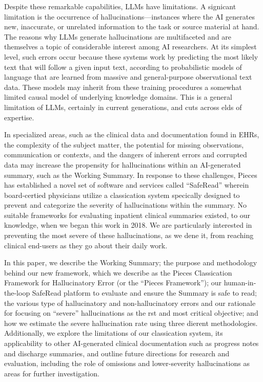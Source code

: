 \documentclass{style/myclass}
\begin{document}
Despite these remarkable capabilities, LLMs have limitations. A signicant limitation is the occurrence of hallucinations—instances where the AI generates new, inaccurate, or unrelated information to the task or source material at hand. The reasons why LLMs generate hallucinations are multifaceted and are themselves a topic of considerable interest among AI researchers. At its simplest level, such errors occur because these systems work by predicting the most likely text that will follow a given input text, according to probabilistic models of language that are learned from massive and general-purpose observational text data. These models may inherit from these training procedures a somewhat limited causal model of underlying knowledge domains. This is a general limitation of LLMs, certainly in current generations, and cuts across elds of expertise.

In specialized areas, such as the clinical data and documentation found in EHRs, the complexity of the subject matter, the potential for missing observations, communication or contexts, and the dangers of inherent errors and corrupted data may increase the propensity for hallucinations within an AI-generated summary, such as the Working Summary. In response to these challenges, Pieces has established a novel set of software and services called “SafeRead” wherein board-certied physicians utilize a classication system specically designed to prevent and categorize the severity of hallucinations within the summary. No suitable frameworks for evaluating inpatient clinical summaries existed, to our knowledge, when we began this work in 2018. We are particularly interested in preventing the most severe of these hallucinations, as we dene it, from reaching clinical end-users as they go about their daily work.

In this paper, we describe the Working Summary; the purpose and methodology behind our new framework, which we describe as the Pieces Classication Framework for Hallucinatory Error (or the “Pieces Framework”); our human-in-the-loop SafeRead platform to evaluate and ensure the Summary is safe to read; the various type of hallucinatory and non-hallucinatory errors and our rationale for focusing on “severe” hallucinations as the rst and most critical objective; and how we estimate the severe hallucination rate using three dierent methodologies. Additionally, we explore the limitations of our classication system, its applicability to other AI-generated clinical documentation such as progress notes and discharge summaries, and outline future directions for research and evaluation, including the role of omissions and lower-severity hallucinations as areas for further investigation.
\end{document}

